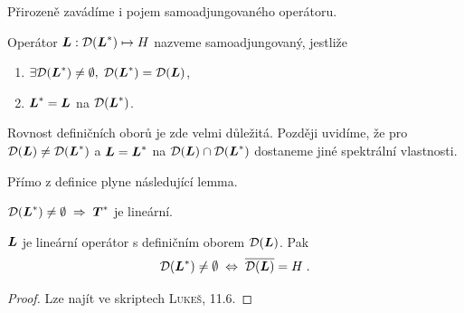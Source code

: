 Přirozeně zavádíme i pojem samoadjungovaného operátoru.

\begin{definition}
Operátor $\boldsymbol{L} : \mathcal{D}(\boldsymbol{L}^*) \mapsto H$ nazveme samoadjungovaný, jestliže \begin{enumerate}
    \item $\exists\mathcal{D}(\boldsymbol{L}^*)\neq\emptyset,\;\mathcal{D}(\boldsymbol{L}^*) = \mathcal{D}(\boldsymbol{L})$,
    \item $\boldsymbol{L}^* = \boldsymbol{L}$ na $\mathcal{D}(\boldsymbol{L}^*)$.
\end{enumerate}
\end{definition}
\begin{remark}
Rovnost definičních oborů je zde velmi důležitá. Později uvidíme, že pro $\mathcal{D}(\boldsymbol{L}) \neq \mathcal{D}(\boldsymbol{L}^*)$ a $\boldsymbol{L} = \boldsymbol{L}^*$ na $\mathcal{D}(\boldsymbol{L}) \cap \mathcal{D}(\boldsymbol{L}^*)$ dostaneme jiné spektrální vlastnosti.
\end{remark}

Přímo z definice plyne následující lemma.
\begin{lemma}
$\mathcal{D}(\boldsymbol{L}^*)\neq\emptyset\;\Rightarrow\; \boldsymbol{T}^*$ je lineární.
\end{lemma}



\begin{theorem}
$\boldsymbol{L}$ je lineární operátor s definičním oborem $\mathcal{D}(\boldsymbol{L})$. Pak $$\mathcal{D}(\boldsymbol{L}^*)\neq\emptyset \;\Leftrightarrow\;\overline{ \mathcal{D}(\boldsymbol{L}) }= H \;.$$
\end{theorem}
\begin{proof}
Lze najít ve skriptech \textsc{Lukeš}, 11.6.
\end{proof}


